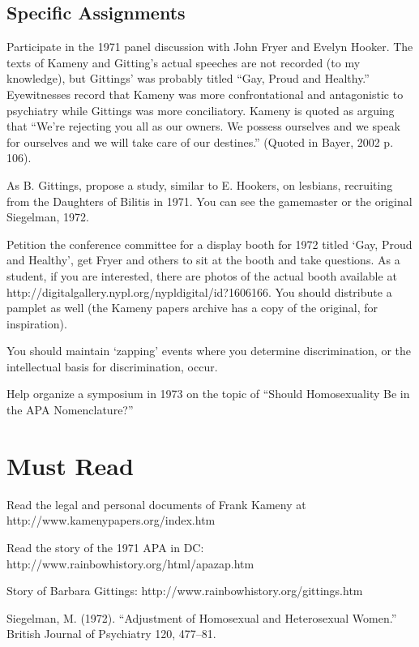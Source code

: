\subsection{Specific Assignments}
\label{specificassignments}

Participate in the 1971 panel discussion with John Fryer and Evelyn Hooker. The texts of Kameny and Gitting's actual speeches are not recorded (to my knowledge), but Gittings' was probably titled ``Gay, Proud and Healthy.'' Eyewitnesses record that Kameny was more confrontational and antagonistic to psychiatry while Gittings was more conciliatory. Kameny is quoted as arguing that ``We're rejecting you all as our owners. We possess ourselves and we speak for ourselves and we will take care of our destines.'' (Quoted in Bayer, 2002 p. 106).

As B. Gittings, propose a study, similar to E. Hookers, on lesbians, recruiting from the Daughters of Bilitis in 1971. You can see the gamemaster or the original Siegelman, 1972.

Petition the conference committee for a display booth for 1972 titled `Gay, Proud and Healthy', get Fryer and others to sit at the booth and take questions. As a student, if you are interested, there are photos of the actual booth available at http:\slash \slash digitalgallery.nypl.org\slash nypldigital\slash id?1606166. You should distribute a pamplet as well (the Kameny papers archive has a copy of the original, for inspiration).

You should maintain `zapping' events where you determine discrimination, or the intellectual basis for discrimination, occur.

Help organize a symposium in 1973 on the topic of ``Should Homosexuality Be in the APA Nomenclature?''

\section{Must Read}
\label{mustread}

Read the legal and personal documents of Frank Kameny at http:\slash \slash www.kamenypapers.org\slash index.htm

Read the story of the 1971 APA in DC: http:\slash \slash www.rainbowhistory.org\slash html\slash apazap.htm

Story of Barbara Gittings: http:\slash \slash www.rainbowhistory.org\slash gittings.htm

Siegelman, M. (1972). ``Adjustment of Homosexual and Heterosexual Women.'' British Journal of Psychiatry 120, 477--81.

